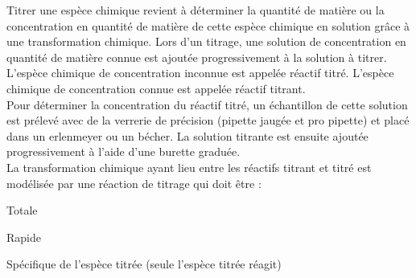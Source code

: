 \documentclass[a4paper,12pt,fleqn]{scrartcl}%
\begin{document}
\begin{cours}
    Titrer une espèce chimique revient à déterminer la quantité de matière ou la concentration en quantité de matière de cette espèce chimique en solution grâce à une transformation chimique. Lors d’un titrage, une solution de concentration en quantité de matière connue est ajoutée progressivement à la solution à titrer.\\
    L’espèce chimique de concentration inconnue est appelée réactif titré. L’espèce chimique de concentration connue est appelée réactif titrant.\\
    Pour déterminer la concentration du réactif titré, un échantillon de cette solution est prélevé avec de la verrerie de précision (pipette jaugée et pro pipette) et placé dans un erlenmeyer ou un bécher. La solution titrante est ensuite ajoutée progressivement à l’aide d’une burette graduée.\\
    La transformation chimique ayant lieu entre les réactifs titrant et titré est modélisée par une réaction de titrage qui doit être :
    \begin{itemize*}
        \item Totale
        \item Rapide
        \item Spécifique de l’espèce titrée (seule l’espèce titrée réagit)
    \end{itemize*}
\end{cours}
\end{document}
